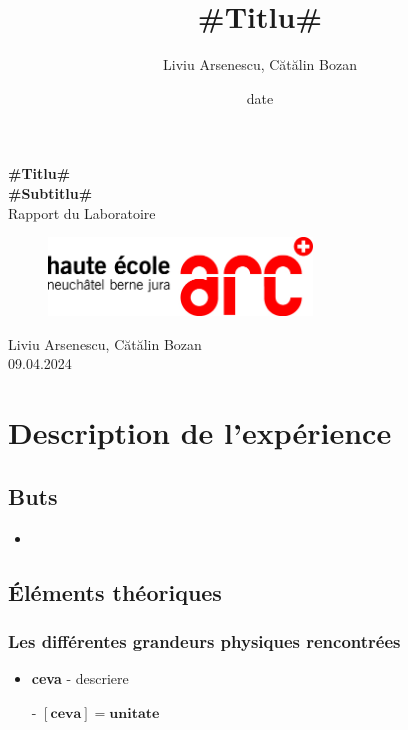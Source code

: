 \documentclass[12pt,a4paper]{article}
\title{#Titlu#}
\author{Liviu Arsenescu, Cătălin Bozan}
\date{date}
\begin{document}
    \begin{titlepage}
        \begin{center}
            \vspace*{\fill}
            \Huge \textbf{#Titlu#} \\
            \Huge \textbf{#Subtitlu#} \\
            \Large Rapport du Laboratoire \\
            \begin{figure}[h]
                \centering
                \includegraphics[width=7cm]{hearclogo.png}
            \end{figure}
            \vspace{\fill}
            \Large Liviu Arsenescu, Cătălin Bozan \\
            09.04.2024

            \vspace*{\fill}
        \end{center}
    \end{titlepage}

    \thispagestyle{empty}
    \tableofcontents
    \newpage

    \section{Description de l'expérience}
    \subsection{Buts}
    \begin{itemize}
        \item 
    \end{itemize}

    \subsection{Éléments théoriques}
    \subsubsection{Les différentes grandeurs physiques rencontrées}
    \begin{minipage}{0.6\linewidth}
        \begin{itemize}
            \item \textbf{ceva} - descriere
        \end{itemize}
    \end{minipage}%
    \hfill
    \begin{minipage}{0.4\linewidth}
        \begin{itemize}
            \item[-] $\bm{[ceva]=unitate}$
        \end{itemize}   
    \end{minipage}
\end{document}
